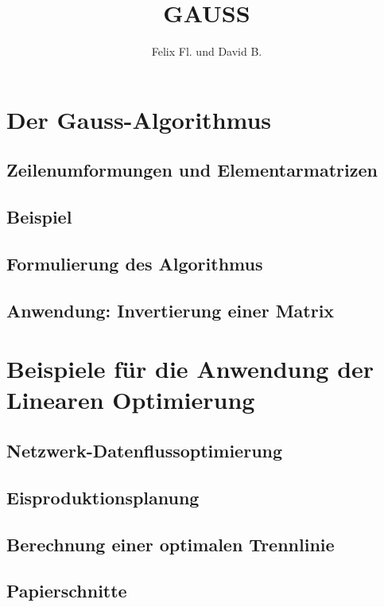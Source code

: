 \documentclass{scrartcl}
\title{GAUSS}
\author{Felix Fl. und David B.}
\begin{document}
\maketitle

\tableofcontents
\newpage

\section{Der Gauss-Algorithmus}

\subsection{Zeilenumformungen und Elementarmatrizen}


\subsection{Beispiel}


\subsection{Formulierung des Algorithmus}


\subsection{Anwendung: Invertierung einer Matrix}



\section{Beispiele für die Anwendung der Linearen Optimierung}

\subsection{Netzwerk-Datenflussoptimierung}

\subsection{Eisproduktionsplanung}

\subsection{Berechnung einer optimalen Trennlinie}

\subsection{Papierschnitte}

\end{document}
